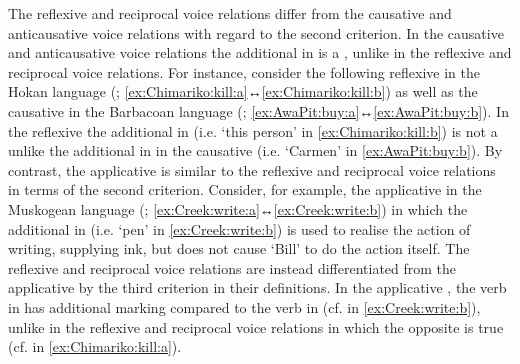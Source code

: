 \smallskip

The reflexive and reciprocal voice relations differ from the causative and anticausative voice relations with regard to the second criterion. In the causative and anticausative voice relations the additional  in  is a , unlike in the reflexive and reciprocal voice relations. For instance, consider the following reflexive  in the Hokan language  (; \ref{ex:Chimariko:kill:a}↔\ref{ex:Chimariko:kill:b}) as well as the causative  in the Barbacoan language  (; \ref{ex:AwaPit:buy:a}↔\ref{ex:AwaPit:buy:b}). In the  reflexive  the additional  in  (i.e. ‘this person’ in \ref{ex:Chimariko:kill:b}) is not a  unlike the additional  in  in the  causative  (i.e. ‘Carmen’ in \ref{ex:AwaPit:buy:b}).  By contrast, the applicative  is similar to the reflexive and reciprocal voice relations in terms of the second criterion. Consider, for example, the applicative  in the Muskogean language  (; \ref{ex:Creek:write:a}↔\ref{ex:Creek:write:b}) in which the additional  in  (i.e. ‘pen’ in \ref{ex:Creek:write:b}) is used to realise the action of writing, supplying ink, but does not cause ‘Bill’ to do the action itself. The reflexive and reciprocal voice relations are instead differentiated from the applicative  by the third criterion in their definitions. In the applicative , the verb in  has additional marking compared to the verb in  (cf.   in \ref{ex:Creek:write:b}), unlike in the reflexive and reciprocal voice relations in which the opposite is true (cf.   in \ref{ex:Chimariko:kill:a}). 

